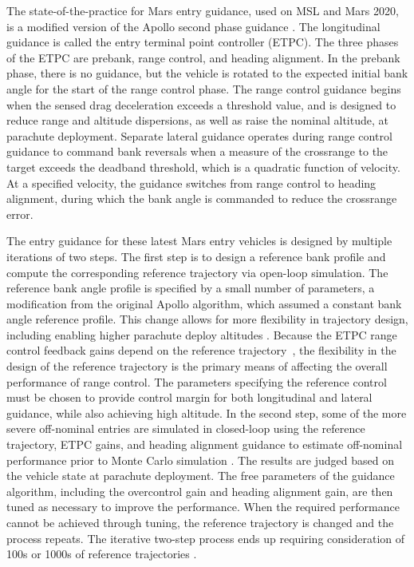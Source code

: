 \documentclass[journal ]{new-aiaa}
\begin{document}
The state-of-the-practice for Mars entry guidance, used on MSL and Mars 2020, is a modified version of the Apollo second phase guidance \cite{MSL_EDL2}. The longitudinal guidance is called the entry terminal point controller (ETPC). 
The three phases of the ETPC are prebank, range control, and heading alignment. In the prebank phase, there is no guidance, but the vehicle is rotated to the expected initial bank angle for the start of the range control phase.
The range control guidance begins when the sensed drag deceleration exceeds a threshold value, and 
is designed to reduce range and altitude dispersions, as well as raise the nominal altitude, at parachute deployment. Separate lateral guidance operates during range control guidance to command bank reversals when a measure of the crossrange to the target exceeds the deadband threshold, which is a quadratic function of velocity. At a specified velocity, the guidance switches from range control to heading alignment, during which the bank angle is commanded to reduce the crossrange error.

The entry guidance for these latest Mars entry vehicles \cite{MSL_EDL2,M2020_EDL} is designed by multiple iterations of two steps. The first step is to design a reference bank profile and compute the corresponding reference trajectory via open-loop simulation. The reference bank angle profile is specified by a small number of parameters, a modification from the original Apollo algorithm, which assumed a constant bank angle reference profile. This change allows for more flexibility in trajectory design, including enabling higher parachute deploy altitudes \cite{MSL_EDL2}. Because the ETPC range control feedback gains depend on the reference trajectory~\cite{Apollo}, the flexibility in the design of the reference trajectory is the primary means of affecting the overall performance of range control. The parameters specifying the reference control must be chosen to provide control margin for both longitudinal and lateral guidance, while also achieving high altitude.
In the second step, some of the more severe off-nominal entries are simulated in closed-loop using the reference trajectory, ETPC gains, and heading alignment guidance to estimate off-nominal performance prior to Monte Carlo simulation \cite{MSL_EDL2}. The results are judged based on the vehicle state at parachute deployment. The free parameters of the guidance algorithm, including the overcontrol gain and heading alignment gain, are then tuned as necessary to improve the performance. When the required performance cannot be achieved through tuning, the reference trajectory is changed and the process repeats. The iterative two-step process ends up requiring consideration of 100s or 1000s of reference trajectories \cite{MSL_EDL2}.
% 
\end{document}
